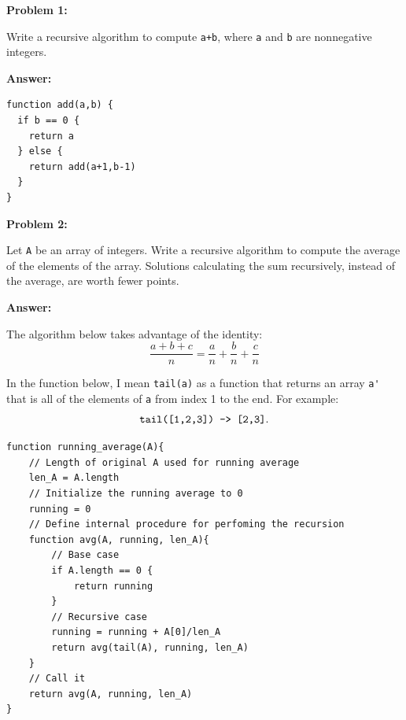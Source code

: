 \documentclass[10pt,letterpaper,final]{report}
\begin{document}
\vline

\noindent\textbf{Problem 1:}

Write a recursive algorithm to compute \verb|a+b|, where \verb|a| and \verb|b| are nonnegative integers.

\noindent\textbf{Answer:}

\begin{mdframed}
\begin{verbatim}
function add(a,b) {
  if b == 0 {
    return a
  } else {
    return add(a+1,b-1)
  }
}
\end{verbatim}
\end{mdframed}

\pagebreak
\noindent\textbf{Problem 2:}

Let \verb|A| be an array of integers. Write a recursive algorithm to compute the average of the elements of the array. Solutions calculating the sum recursively, instead of the average, are worth fewer points.

\noindent\textbf{Answer:}

The algorithm below takes advantage of the identity:
\[
\frac{a + b + c}{n} = \frac{a}{n} + \frac{b}{n} + \frac{c}{n}
\]

In the function below, I mean \verb|tail(a)| as a function that returns an array \verb|a'| that is all of the elements of \verb|a| from index 1 to the end. For example: \[\verb|tail([1,2,3]) -> [2,3]|.\]

\begin{mdframed}
\begin{verbatim}
function running_average(A){
    // Length of original A used for running average
    len_A = A.length
    // Initialize the running average to 0
    running = 0
    // Define internal procedure for perfoming the recursion
    function avg(A, running, len_A){
        // Base case
        if A.length == 0 {
            return running
        }
        // Recursive case
        running = running + A[0]/len_A
        return avg(tail(A), running, len_A)
    }
    // Call it
    return avg(A, running, len_A)    
}
\end{verbatim}
\end{mdframed}
\end{document}
